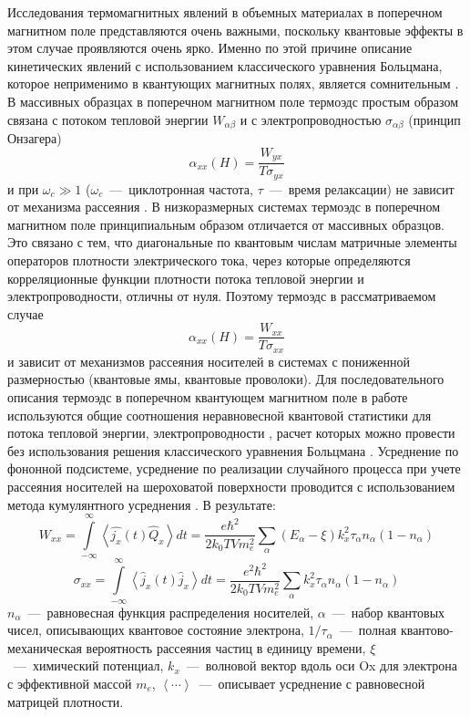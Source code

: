 Исследования термомагнитных явлений в объемных материалах в поперечном магнитном поле представляются очень важными, поскольку квантовые эффекты в этом случае проявляются очень ярко. Именно по этой причине описание кинетических явлений с использованием классического уравнения Больцмана, которое неприменимо в квантующих магнитных полях, является сомнительным \cite{Askerov1970}. В массивных образцах в поперечном магнитном поле термоэдс простым образом связана с потоком тепловой энергии $W_{\alpha\beta}$ и с электропроводностью $\sigma_{\alpha\beta}$ (принцип Онзагера)
\[
\alpha_{xx}(H) = \frac{W_{yx}}{T \sigma_{yx}}
\] 
и при $\omega_c \gg 1$ ($\omega_c$~---~циклотронная частота, $\tau$~---~время релаксации) не зависит от механизма рассеяния \cite{Askerov1970}. В низкоразмерных системах термоэдс в поперечном магнитном поле принципиальным образом отличается от массивных образцов. Это связано с тем, что диагональные по квантовым числам матричные элементы операторов плотности электрического тока, через которые определяются корреляционные функции плотности потока тепловой энергии и электропроводности, отличны от нуля. Поэтому термоэдс в рассматриваемом случае
\begin{equation} \label{eq:44_05} 
\alpha_{xx}(H) = \frac{W_{xx}}{T \sigma_{xx}}
\end{equation}
и зависит от механизмов рассеяния носителей в системах с пониженной размерностью (квантовые ямы, квантовые проволоки). Для последовательного описания термоэдс в поперечном квантующем магнитном поле в работе используются общие соотношения неравновесной квантовой статистики для потока тепловой энергии, электропроводности \cite{Kubo1957}, расчет которых можно провести без использования решения классического уравнения Больцмана \cite{Khamidullin2002}. Усреднение по фононной подсистеме, усреднение по реализации случайного процесса при учете рассеяния носителей на шероховатой поверхности проводится с использованием метода кумулянтного усреднения \cite{Kubo1962}. В результате:  
\begin{equation} \label{eq:44_07} 
W_{xx} = \int\limits_{- \infty }^{\infty}{\left\langle \hat{j_x}(t) \hat{Q}_x \right\rangle  dt} =
\frac{e \hbar^2 }{2 k_0 TV m_e^2} \sum_{\alpha}{\left( E_{\alpha} - \xi \right) k_x^2 \tau_{\alpha} n_{\alpha}\left( 1 - n_{\alpha} \right) }
\end{equation}
\begin{equation} \label{eq:44_08} 
\sigma_{xx} = \int\limits_{- \infty }^{\infty}{\left\langle \hat{j}_x(t) \hat{j}_x \right\rangle  dt} =
\frac{e^2 \hbar^2 }{2 k_0 TV m_e^2} \sum_{\alpha}{k_x^2 \tau_{\alpha} n_{\alpha}\left( 1 - n_{\alpha} \right) }
\end{equation}
$n_{\alpha}$~---~равновесная функция распределения носителей, $\alpha$~---~набор квантовых чисел, описывающих квантовое состояние электрона, $1/\tau_{\alpha}$~---~полная квантово-механическая вероятность рассеяния частиц в единицу времени, $\xi$~---~химический потенциал, $k_x$~---~волновой вектор вдоль оси Ox для электрона с эффективной массой $m_e$, $\left\langle \cdots \right\rangle$~---~описывает усреднение с равновесной матрицей плотности.


